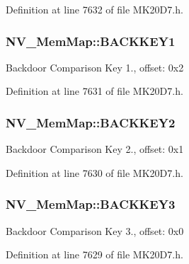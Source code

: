 Definition at line 7632 of file M\+K20\+D7.\+h.

\subsubsection[{\texorpdfstring{B\+A\+C\+K\+K\+E\+Y1}{BACKKEY1}}]{ N\+V\+\_\+\+Mem\+Map\+::\+B\+A\+C\+K\+K\+E\+Y1}\hypertarget{struct_n_v___mem_map_ab43748ac2b6d99cef1a62072d17a707b}{}\label{struct_n_v___mem_map_ab43748ac2b6d99cef1a62072d17a707b}
Backdoor Comparison Key 1., offset\+: 0x2 

Definition at line 7631 of file M\+K20\+D7.\+h.

\subsubsection[{\texorpdfstring{B\+A\+C\+K\+K\+E\+Y2}{BACKKEY2}}]{ N\+V\+\_\+\+Mem\+Map\+::\+B\+A\+C\+K\+K\+E\+Y2}\hypertarget{struct_n_v___mem_map_af746c853a18c5e8910e556b32073f938}{}\label{struct_n_v___mem_map_af746c853a18c5e8910e556b32073f938}
Backdoor Comparison Key 2., offset\+: 0x1 

Definition at line 7630 of file M\+K20\+D7.\+h.

\subsubsection[{\texorpdfstring{B\+A\+C\+K\+K\+E\+Y3}{BACKKEY3}}]{ N\+V\+\_\+\+Mem\+Map\+::\+B\+A\+C\+K\+K\+E\+Y3}\hypertarget{struct_n_v___mem_map_a836e107cd6936ce8acd9279af7e9657e}{}\label{struct_n_v___mem_map_a836e107cd6936ce8acd9279af7e9657e}
Backdoor Comparison Key 3., offset\+: 0x0 

Definition at line 7629 of file M\+K20\+D7.\+h.

